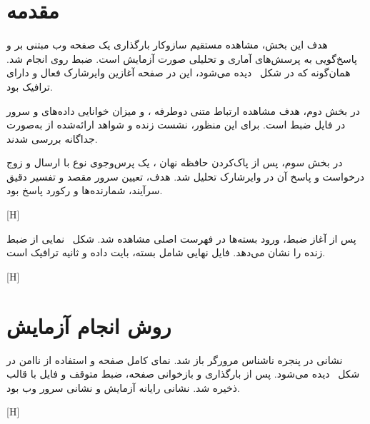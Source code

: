 
\section{مقدمه}

هدف این بخش، مشاهده مستقیم سازوکار بارگذاری یک صفحه وب مبتنی بر  و پاسخ‌گویی
به پرسش‌های آماری و تحلیلی صورت آزمایش است. ضبط روی 
 انجام شد.
همان‌گونه که در شکل~ دیده می‌شود، این  در صفحه آغازین وایرشارک
فعال و دارای ترافیک بود.

در بخش دوم، هدف مشاهده ارتباط متنی دوطرفه ، 
و میزان خوانایی داده‌های  و سرور در فایل ضبط است. برای این منظور،
نشست زنده  و شواهد
ارائه‌شده از  به‌صورت جداگانه بررسی شدند.

در بخش سوم، پس از پاک‌کردن حافظه نهان ، یک پرس‌وجوی نوع  با
 ارسال و زوج درخواست و پاسخ آن در وایرشارک تحلیل شد. هدف، تعیین سرور مقصد و
تفسیر دقیق سرآیند، شمارنده‌ها و رکورد پاسخ  بود.

[H]

پس از آغاز ضبط، ورود بسته‌ها در فهرست اصلی مشاهده شد. شکل~ نمایی از
ضبط زنده را نشان می‌دهد. فایل نهایی  شامل  بسته،  بایت داده و
 ثانیه ترافیک است.

[H]

\section{روش انجام آزمایش}

نشانی \href{http://sina.sharif.edu/\%7Eazad/}{}
در پنجره ناشناس مرورگر  باز شد.
نمای کامل صفحه و استفاده از  ناامن در شکل~ دیده می‌شود.
پس از بارگذاری و بازخوانی صفحه، ضبط متوقف و فایل با قالب  ذخیره شد. نشانی رایانه
آزمایش  و نشانی سرور وب  بود.

[H]

